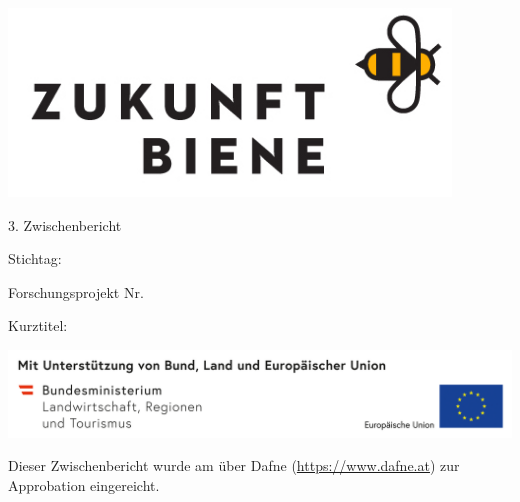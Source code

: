 \begin{titlepage}

\begin{center}

\includegraphics[height=50mm]{figures/logos/zukunft_biene_logo_rechteck}

\vfill\vfill\vfill
\vfill\vfill\vfill

{\large 3. Zwischenbericht}

\vfill
Stichtag: \mydeadlinedate

\vfill\vfill\vfill

Forschungsprojekt Nr. \myprojectnumber

\vfill\vfill\vfill
\vfill\vfill\vfill

{\LARGE\textbf{\mytitle}\par}

\vfill
Kurztitel: {\bfseries\large\mysubtitle}

\vfill\vfill\vfill

\vspace*{\fill}
\includegraphics[width=\textwidth]{figures/logos/5_Foeg_Leiste_Bund+Land+EU_2020_RGB_leer}

\newpage

\vspace*{\fill}

Dieser Zwischenbericht wurde am {\mysubmissiondate} über Dafne (\url{https://www.dafne.at}) zur Approbation eingereicht. 

\end{center}
\end{titlepage}
